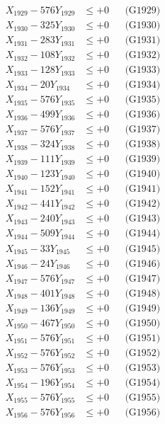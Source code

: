 \documentclass[a4paper,10pt]{article}
\begin{document}
{\begin{align}
X_{1929} - 576Y_{1929} &\leq +0 && \text{(G1929)} \\
X_{1930} - 325Y_{1930} &\leq +0 && \text{(G1930)} \\
\allowbreak
X_{1931} - 283Y_{1931} &\leq +0 && \text{(G1931)} \\
X_{1932} - 108Y_{1932} &\leq +0 && \text{(G1932)} \\
X_{1933} - 128Y_{1933} &\leq +0 && \text{(G1933)} \\
X_{1934} - 20Y_{1934} &\leq +0 && \text{(G1934)} \\
X_{1935} - 576Y_{1935} &\leq +0 && \text{(G1935)} \\
X_{1936} - 499Y_{1936} &\leq +0 && \text{(G1936)} \\
X_{1937} - 576Y_{1937} &\leq +0 && \text{(G1937)} \\
X_{1938} - 324Y_{1938} &\leq +0 && \text{(G1938)} \\
X_{1939} - 111Y_{1939} &\leq +0 && \text{(G1939)} \\
X_{1940} - 123Y_{1940} &\leq +0 && \text{(G1940)} \\
\allowbreak
X_{1941} - 152Y_{1941} &\leq +0 && \text{(G1941)} \\
X_{1942} - 441Y_{1942} &\leq +0 && \text{(G1942)} \\
X_{1943} - 240Y_{1943} &\leq +0 && \text{(G1943)} \\
X_{1944} - 509Y_{1944} &\leq +0 && \text{(G1944)} \\
X_{1945} - 33Y_{1945} &\leq +0 && \text{(G1945)} \\
X_{1946} - 24Y_{1946} &\leq +0 && \text{(G1946)} \\
X_{1947} - 576Y_{1947} &\leq +0 && \text{(G1947)} \\
X_{1948} - 401Y_{1948} &\leq +0 && \text{(G1948)} \\
X_{1949} - 136Y_{1949} &\leq +0 && \text{(G1949)} \\
X_{1950} - 467Y_{1950} &\leq +0 && \text{(G1950)} \\
\allowbreak
X_{1951} - 576Y_{1951} &\leq +0 && \text{(G1951)} \\
X_{1952} - 576Y_{1952} &\leq +0 && \text{(G1952)} \\
X_{1953} - 576Y_{1953} &\leq +0 && \text{(G1953)} \\
X_{1954} - 196Y_{1954} &\leq +0 && \text{(G1954)} \\
X_{1955} - 576Y_{1955} &\leq +0 && \text{(G1955)} \\
X_{1956} - 576Y_{1956} &\leq +0 && \text{(G1956)} \\

\end{align}}
\end{document}
